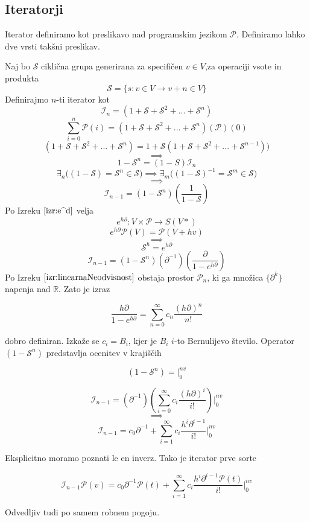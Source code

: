 \documentclass{article}
\newcommand{\RR}{\mathbb{R}}
\newcommand{\Shift}{\mathcal{S}}
\newcommand{\dP}{\mathcal{P}}
\newcommand{\D}{\partial}
\begin{document}
 \subsection{Iteratorji}
 
 Iterator definiramo kot preslikavo nad programskim jezikom $\dP$. Definiramo lahko dve vrsti takšni preslikav.
 
 Naj bo $\Shift$ ciklična grupa generirana za specifičen $v\in V$,za operaciji vsote in produkta
 $$\Shift=\{s:v\in V\to v+n\in V\}$$
 Definirajmo $n$-ti iterator kot
 $$\mathcal{I}_n=(1+\Shift+\Shift^2+...+\Shift^n)$$
 $$\sum\limits_{i=0}^{n}\dP(i)=(1+\Shift+\Shift^2+...+\Shift^n)(\dP)(0)$$
 $$(1+\Shift+\Shift^2+...+\Shift^n)=1+\Shift(1+\Shift+\Shift^2+...+\Shift^{n-1}))$$
 $$\implies$$
 $$1-\Shift^n=(1-S)\mathcal{I}_n$$
 $$\exists_n\Big((1-\Shift)=\Shift^n\in\Shift\Big)\implies \exists_m\Big((1-\Shift)^{-1}=\Shift^m\in \Shift\Big)$$
 $$\implies$$
 $$\mathcal{I}_{n-1}=(1-\Shift^n)(\frac{1}{1-\Shift})$$
 Po Izreku $\ref{izr:e^d}$ velja
 $$e^{h\D}:V\times\dP\to S(V*)$$
 $$e^{h\D}\dP(V)=\dP(V+hv)$$
 $$\implies$$
 $$\Shift^h=e^{h\D}$$
 $$\mathcal{I}_{n-1}=(1-\Shift^n)(\D^{-1})(\frac{\D}{1-e^{h\D}})$$
 Po Izreku $\ref{izr:linearnaNeodvisnost}$  obstaja prostor $\dP_n$, ki ga množica $\{\D^k\}$ napenja nad $\RR$. Zato je izraz   
   
  \begin{equation}
  	\frac{h\D}{1-e^{h\D}}=\sum\limits_{n=0}^{\infty}c_n\frac{(h\D)^n}{n!}
  \end{equation}
  
  dobro definiran. Izkaže se $c_i=B_i$, kjer je $B_i$ $i$-to Bernulijevo število. Operator $(1-\Shift^n)$ predstavlja ocenitev v krajiščih
  
  $$(1-\Shift^n)=\Bigg\vert_0^{nv}$$
  
  $$\mathcal{I}_{n-1}=(\D^{-1})(\sum\limits_{i=0}^{\infty}c_i\frac{(h\D)^i}{i!})\Bigg\vert_0^{nv}$$
  $$\implies$$
  $$\mathcal{I}_{n-1}=c_0\D^{-1}+\sum\limits_{i=1}^{\infty}c_i\frac{h^i\D^{i-1}}{i!}\Bigg\vert_0^{nv}$$
  
  Eksplicitno moramo poznati le en inverz. Tako je iterator prve sorte
  
  \begin{equation}
  	\mathcal{I}_{n-1}\dP(v)=c_0\D^{-1}\dP(t)+\sum\limits_{i=1}^{\infty}c_i\frac{h^i\D^{i-1}\dP(t)}{i!}\Bigg\vert_0^{nv}
  \end{equation}
  
  Odvedljiv tudi po samem robnem pogoju.
  
\end{document}
